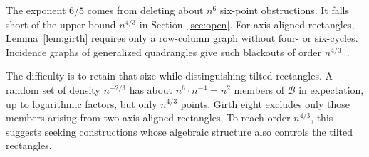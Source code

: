 The exponent $6/5$ comes from deleting about $n^6$ six-point obstructions.
It falls short of the upper bound $n^{4/3}$ in Section~\ref{sec:open}.
For axis-aligned rectangles, Lemma~\ref{lem:girth} requires only a row-column
graph without four- or six-cycles. Incidence graphs of generalized quadrangles
give such blackouts of order $n^{4/3}$~\cite{benson1966}.

The difficulty is to retain that size while distinguishing tilted rectangles.
A random set of density $n^{-2/3}$ has about $n^6\cdot n^{-4}=n^2$ members
of $\mathcal B$ in expectation, up to logarithmic factors, but only $n^{4/3}$
points. Girth eight excludes only those members arising from two axis-aligned
rectangles. To reach order $n^{4/3}$, this suggests seeking constructions
whose algebraic structure also controls the tilted rectangles.
